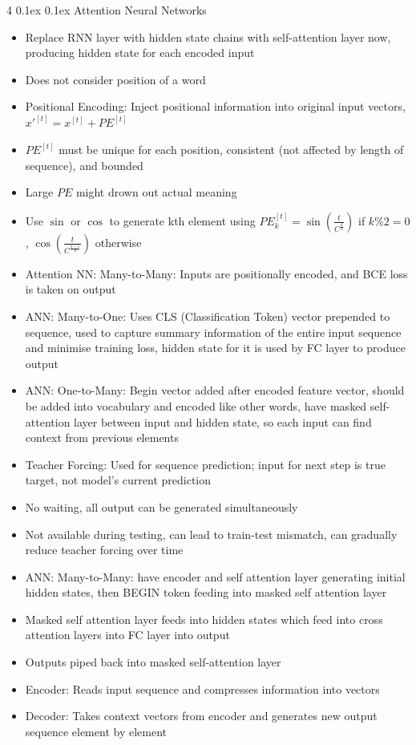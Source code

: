 \documentclass[10pt, landscape]{article}
\makeatletter
\renewcommand{\subsection}{\@startsection{subsection}{2}{0mm}%
  {0.1ex} %
  {0.1ex} %
  {\normalfont\normalsize\bfseries}}
\makeatother
\begin{document}
\begin{multicols*}{4}
\subsection{Attention Neural Networks}
\begin{itemize}
    \item Replace RNN layer with hidden state chains with self-attention layer now, producing hidden state for each encoded input
    \item Does not consider position of a word
    \item Positional Encoding: Inject positional information into original input vectors, $x'^{[t]}=x^{[t]}+PE^{[t]}$
    \item $PE^{[t]}$ must be unique for each position, consistent (not affected by length of sequence), and bounded
    \item Large $PE$ might drown out actual meaning
    \item Use $\sin$ or $\cos$ to generate kth element using $PE_k^{[t]}=\sin(\frac{t}{C^{\frac{k}{d}}})$ if $k\%2=0$, $\cos(\frac{t}{C^{\frac{k-1}{d}}})$ otherwise
    \item Attention NN: Many-to-Many: Inputs are positionally encoded, and BCE loss is taken on output
    \item ANN: Many-to-One: Uses CLS (Classification Token) vector prepended to sequence, used to capture summary information of the entire input sequence and minimise training loss, hidden state for it is used by FC layer to produce output
    \item ANN: One-to-Many: Begin vector added after encoded feature vector, should be added into vocabulary and encoded like other words, have masked self-attention layer between input and hidden state, so each input can find context from previous elements
    \item Teacher Forcing: Used for sequence prediction; input for next step is true target, not model's current prediction
    \item No waiting, all output can be generated simultaneously
    \item Not available during testing, can lead to train-test mismatch, can gradually reduce teacher forcing over time
    \item ANN: Many-to-Many: have encoder and self attention layer generating initial hidden states, then BEGIN token feeding into masked self attention layer
    \item Masked self attention layer feeds into hidden states which feed into cross attention layers into FC layer into output
    \item Outputs piped back into masked self-attention layer
    \item Encoder: Reads input sequence and compresses information into vectors
    \item Decoder: Takes context vectors from encoder and generates new output sequence element by element
\end{itemize}


\end{multicols*}
\end{document}
